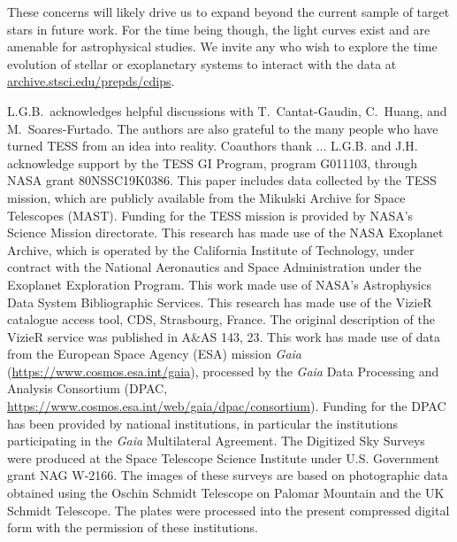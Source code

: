 \documentclass[12pt,twocolumn,tighten]{aastex62}
\newcommand{\stscilink}{\url{archive.stsci.edu/prepds/cdips}}
\begin{document}
These concerns will likely drive us to expand beyond the current
sample of target stars in future work.  For the time being though, 
the light curves exist and are amenable for astrophysical studies.  We
invite any who wish to explore the time evolution of stellar or
exoplanetary systems to interact with the data at \stscilink.



\acknowledgements
L.G.B.\ acknowledges helpful discussions with 
T.~Cantat-Gaudin,
C.~Huang,
and M.~Soares-Furtado.  The authors are also
grateful to the many people who have turned TESS from an idea into
reality.
%
Coauthors thank ... %
%
L.G.B. and J.H. acknowledge support by the TESS GI Program, program
G011103, through NASA grant 80NSSC19K0386.
%
This paper includes data collected by the TESS mission, which are
publicly available from the Mikulski Archive for Space Telescopes
(MAST).
%
Funding for the TESS mission is provided by NASA's Science Mission
directorate.
%
This research has made use of the NASA Exoplanet Archive, which is
operated by the California Institute of Technology, under contract
with the National Aeronautics and Space Administration under the
Exoplanet Exploration Program.
%
This work made use of NASA's Astrophysics Data System Bibliographic
Services.
%
This research has made use of the VizieR catalogue access tool, CDS,
Strasbourg, France. The original description of the VizieR service was
published in A\&AS 143, 23.
%
This work has made use of data from the European Space Agency (ESA)
mission {\it Gaia} (\url{https://www.cosmos.esa.int/gaia}), processed
by the {\it Gaia} Data Processing and Analysis Consortium (DPAC,
\url{https://www.cosmos.esa.int/web/gaia/dpac/consortium}). Funding
for the DPAC has been provided by national institutions, in particular
the institutions participating in the {\it Gaia} Multilateral
Agreement.
%
The Digitized Sky Surveys were produced at the Space Telescope Science
Institute under U.S. Government grant NAG W-2166. The images of these
surveys are based on photographic data obtained using the Oschin
Schmidt Telescope on Palomar Mountain and the UK Schmidt Telescope.
The plates were processed into the present compressed digital form
with the permission of these institutions.
%
\newline
%
%
\end{document}
